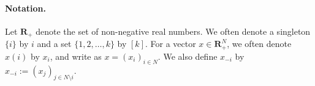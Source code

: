 \paragraph{Notation.}
Let $\mathbf R_+$ denote the set of non-negative real numbers. 
We often denote a singleton $\{i\}$ by $i$ and a set $\{1,2,\ldots,k\}$ by $[k]$. For a vector $x\in \mathbf R^N_+$, we often denote $x(i)$ by $x_i$, and write as $x= (x_i)_{i\in N}$. We also define $x_{-i}$ by $x_{-i}:=(x_j)_{j\in N\setminus i}$.